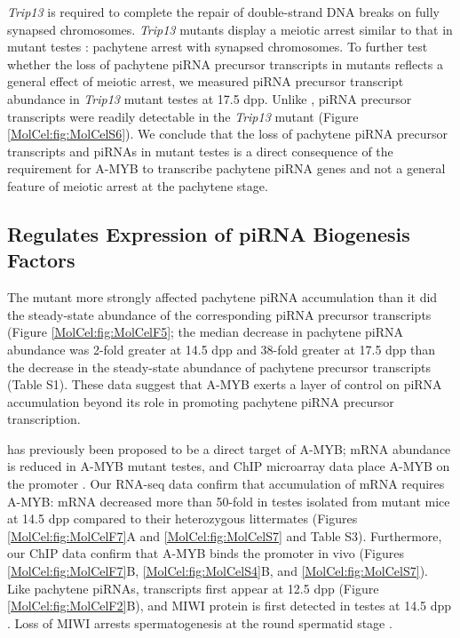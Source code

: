     \textit{Trip13} is required to complete the repair of double-strand DNA breaks on fully synapsed chromosomes. \textit{Trip13} mutants display a meiotic arrest similar to that in \amyb{} mutant testes \citep{Li2007}: pachytene arrest with synapsed chromosomes. To further test whether the loss of pachytene piRNA precursor transcripts in \amyb{} mutants reflects a general effect of meiotic arrest, we measured piRNA precursor transcript abundance in \textit{Trip13} mutant testes at 17.5 dpp. Unlike \amyb{}, piRNA precursor transcripts were readily detectable in the \textit{Trip13} mutant (Figure \ref{MolCel:fig:MolCelS6}). We conclude that the loss of pachytene piRNA precursor transcripts and piRNAs in \amyb{} mutant testes is a direct consequence of the requirement for A-MYB to transcribe pachytene piRNA genes and not a general feature of meiotic arrest at the pachytene stage.

  \subsection{\amyb{} Regulates Expression of piRNA Biogenesis Factors}
    \label{MolCel:subsec:A-Myb regulations piRNA machinery}

    The \amyb{} mutant more strongly affected pachytene piRNA accumulation than it did the steady-state abundance of the corresponding piRNA precursor transcripts (Figure \ref{MolCel:fig:MolCelF5}; the median decrease in pachytene piRNA abundance was 2-fold greater at 14.5 dpp and 38-fold greater at 17.5 dpp than the decrease in the steady-state abundance of pachytene precursor transcripts (Table S1). These data suggest that A-MYB exerts a layer of control on piRNA accumulation beyond its role in promoting pachytene piRNA precursor transcription.

    \miwi{} has previously been proposed to be a direct target of A-MYB; \miwi{} mRNA abundance is reduced in A-MYB mutant testes, and ChIP microarray data place A-MYB on the \miwi{} promoter \citep{Bolcun-Filas2011}. Our RNA-seq data confirm that accumulation of \miwi{} mRNA requires A-MYB: \miwi{} mRNA decreased more than 50-fold in testes isolated from \amyb{} mutant mice at 14.5 dpp compared to their heterozygous littermates (Figures \ref{MolCel:fig:MolCelF7}A and \ref{MolCel:fig:MolCelS7} and Table S3). Furthermore, our ChIP data confirm that A-MYB binds the \miwi{} promoter in vivo (Figures \ref{MolCel:fig:MolCelF7}B, \ref{MolCel:fig:MolCelS4}B, and \ref{MolCel:fig:MolCelS7}). Like pachytene piRNAs, \miwi{} transcripts first appear at 12.5 dpp (Figure \ref{MolCel:fig:MolCelF2}B), and MIWI protein is first detected in testes at 14.5 dpp \citep{Deng2002c}. Loss of MIWI arrests spermatogenesis at the round spermatid stage \citep{Deng2002c}.

